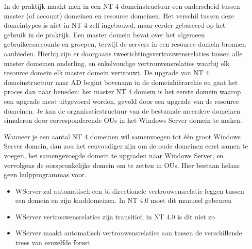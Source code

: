 In de praktijk maakt men in een NT 4 domeinstructuur een onderscheid tussen
master (of account) domeinen en resource domeinen. Het verschil tussen deze
domeintypes is niet in NT 4 zelf ingebouwd, maar eerder gebaseerd op het gebruik
in de praktijk. Een master domein bevat over het algemeen gebruikersaccounts en
groepen, terwijl de servers in een resource domein bronnen aanbieden. Hierbij
zijn er doorgaans tweerichtingsvertrouwensrelaties tussen alle master domeinen
onderling, en enkelvoudige vertrouwensrelaties waarbij elk resource domein elk
master domein vertrouwt.
De upgrade van NT 4 domeinstructuur naar AD begint bovenaan in de
domeinhiërarchie en gaat het proces dan naar beneden: het master NT 4 domein is
het eerste domein waarop een upgrade meot uitgevoerd worden, gevold door een
upgrade van de resource domeinen. Je kan de organisatiestructuur van de
bestaande meerdere domeinen simuleren door corresponderende OUs in het Windows
Server domein te maken.

Wanneer je een aantal NT 4 domeinen wil samenvoegen tot één groot Windows Server
domein, dan zou het eenvoudiger zijn om de oude domeinen eerst samen te voegen,
het samengevoegde domein te upgraden naar Windows Server, en vervolgens de
oorspronkelijke domein om te zetten in OUs. Hier bestaan helaas geen
hulpprogrammas voor.

\begin{itemize}
	\item WServer zal automatisch een bi-directionele vertrouwensrelatie
		leggen tussen een domein en zijn kinddomeinen. In NT 4.0 moet
		dit manueel gebeuren
	\item WServer vertrouwensrelaties zijn transitief, in NT 4.0 is dit niet
		zo
	\item WServer maakt automatisch vertrouwensrelaties aan tussen de
		verschillende trees van eenzelfde forest
\end{itemize}
